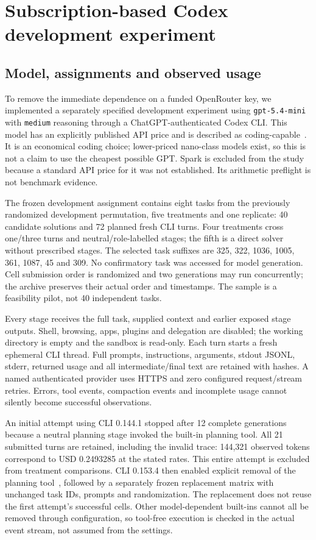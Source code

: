 \section{Subscription-based Codex development experiment}\label{sec:codexpilot}

\subsection{Model, assignments and observed usage}
To remove the immediate dependence on a funded OpenRouter key, we implemented a separately specified development experiment using \texttt{gpt-5.4-mini} with \texttt{medium} reasoning through a ChatGPT-authenticated Codex CLI. This model has an explicitly published API price and is described as coding-capable~\cite{openai54mini2026,openaipricing2026}. It is an economical coding choice; lower-priced nano-class models exist, so this is not a claim to use the cheapest possible GPT. Spark is excluded from the study because a standard API price for it was not established. Its arithmetic preflight is not benchmark evidence.

The frozen development assignment contains eight tasks from the previously randomized development permutation, five treatments and one replicate: 40 candidate solutions and 72 planned fresh CLI turns. Four treatments cross one/three turns and neutral/role-labelled stages; the fifth is a direct solver without prescribed stages. The selected task suffixes are 325, 322, 1036, 1005, 361, 1087, 45 and 309. No confirmatory task was accessed for model generation. Cell submission order is randomized and two generations may run concurrently; the archive preserves their actual order and timestamps. The sample is a feasibility pilot, not 40 independent tasks.

Every stage receives the full task, supplied context and earlier exposed stage outputs. Shell, browsing, apps, plugins and delegation are disabled; the working directory is empty and the sandbox is read-only. Each turn starts a fresh ephemeral CLI thread. Full prompts, instructions, arguments, stdout JSONL, stderr, returned usage and all intermediate/final text are retained with hashes. A named authenticated provider uses HTTPS and zero configured request/stream retries. Errors, tool events, compaction events and incomplete usage cannot silently become successful observations.

An initial attempt using CLI 0.144.1 stopped after 12 complete generations because a neutral planning stage invoked the built-in planning tool. All 21 submitted turns are retained, including the invalid trace: 144,321 observed tokens correspond to USD 0.2493285 at the stated rates. This entire attempt is excluded from treatment comparisons. CLI 0.153.4 then enabled explicit removal of the planning tool~\cite{codexrelease2026}, followed by a separately frozen replacement matrix with unchanged task IDs, prompts and randomization. The replacement does not reuse the first attempt's successful cells. Other model-dependent built-ins cannot all be removed through configuration, so tool-free execution is checked in the actual event stream, not assumed from the settings.

